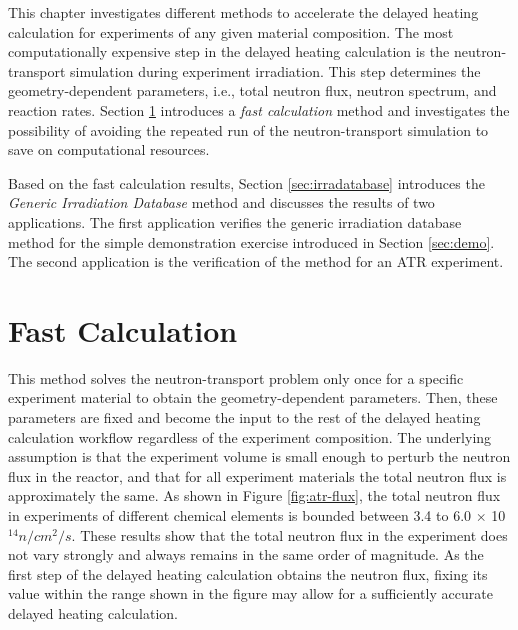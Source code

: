 \label{ch:database}

This chapter investigates different methods to accelerate the delayed heating calculation for experiments of any given material composition.
The most computationally expensive step in the delayed heating calculation is the neutron-transport simulation during experiment irradiation.
This step determines the geometry-dependent parameters, i.e., total neutron flux, neutron spectrum, and reaction rates.
Section \ref{sec:fast} introduces a \textit{fast calculation} method and investigates the possibility of avoiding the repeated run of the neutron-transport simulation to save on computational resources.

Based on the fast calculation results, Section \ref{sec:irradatabase} introduces the \textit{Generic Irradiation Database} method and discusses the results of two applications.
The first application verifies the generic irradiation database method for the simple demonstration exercise introduced in Section \ref{sec:demo}.
The second application is the verification of the method for an ATR experiment.

\section{Fast Calculation}
\label{sec:fast}

This method solves the neutron-transport problem only once for a specific experiment material to obtain the geometry-dependent parameters.
Then, these parameters are fixed and become the input to the rest of the delayed heating calculation workflow regardless of the experiment composition.
The underlying assumption is that the experiment volume is small enough to perturb the neutron flux in the reactor, and that for all experiment materials the total neutron flux is approximately the same.
As shown in Figure \ref{fig:atr-flux}, the total neutron flux in experiments of different chemical elements is bounded between 3.4 to 6.0 $\times$ 10$^{14} n/cm^2/s$.
These results show that the total neutron flux in the experiment does not vary strongly and always remains in the same order of magnitude.
As the first step of the delayed heating calculation obtains the neutron flux, fixing its value within the range shown in the figure may allow for a sufficiently accurate delayed heating calculation.

